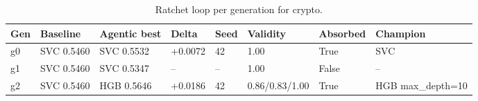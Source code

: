 \begin{table}[H]
\centering\small
\caption{Ratchet loop per generation for crypto.}
\label{tab:ratchet-generations-ratchet-ledger-crypto}
\begin{tabular}{llllllll}
\toprule
Gen & Baseline & Agentic best & Delta & Seed & Validity & Absorbed & Champion \\
\midrule
g0 & SVC 0.5460 & SVC 0.5532 & +0.0072 & 42 & 1.00 & True & SVC \\
g1 & SVC 0.5460 & SVC 0.5347 & -- & -- & 1.00 & False & -- \\
g2 & SVC 0.5460 & HGB 0.5646 & +0.0186 & 42 & 0.86/0.83/1.00 & True & HGB max\_depth=10 \\
\bottomrule
\end{tabular}
\end{table}
